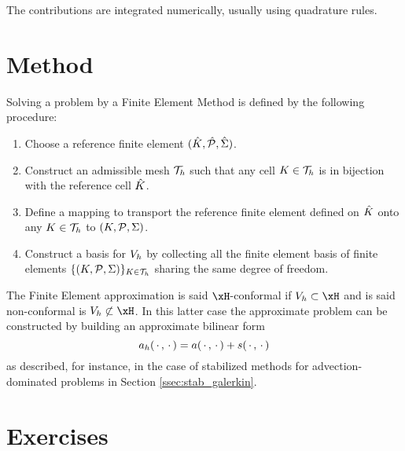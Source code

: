 The contributions are integrated numerically, usually using quadrature rules.

\section{Method}

\begin{lgrthm}\label{alg:fem}

Solving a problem by a Finite Element Method is defined by the following procedure:
\begin{enumerate}
\item Choose a reference finite element ${({\hat {{K}}},{\hat {{\mathcal P}}}, {\hat{{\Sigma}}})}$.
\item Construct an admissible mesh ${\mathcal T}_h$ such that any cell ${K} \in {\mathcal T}_h$ is in bijection with the reference cell ${\hat {{K}}}$.
\item Define a mapping to transport the reference finite element defined on ${\hat {{K}}}$ onto any ${K} \in {\mathcal T}_h$ to ${({K},{\mathcal P}, {\Sigma})}$.
\item Construct a basis for ${{V}}_h$ by collecting all the finite element basis of finite elements $\lbrace {({K},{\mathcal P}, {\Sigma})} \rbrace_{{K} \in {\mathcal T}_h}$ sharing the same degree of freedom.

\end{enumerate}
\end{lgrthm}

\begin{rmrk}
The Finite Element approximation is said $\xH$-conformal if $\xVh\subset \xH$ and is said non-conformal is $\xVh\not\subset \xH$. In this latter case the approximate problem can be constructed by building an approximate bilinear form
\begin{equation*}
a_h(\,{\mathbf\cdot}\,,\,{\mathbf\cdot}\,) = a(\,{\mathbf\cdot}\,,\,{\mathbf\cdot}\,) + s(\,{\mathbf\cdot}\,,\,{\mathbf\cdot}\,)
\end{equation*}
as described, for instance, in the case of stabilized methods for advection-dominated problems in Section \ref{ssec:stab_galerkin}.
\end{rmrk}


\section{Exercises}



